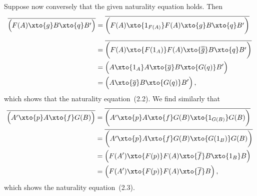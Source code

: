 Suppose now conversely that the given naturality equation holds.
Then
\begin{align*}
	\adjtranspose{
		\Bigl(
			F(A)
			\xto{g}
			B
			\xto{q}
			B'
		\Bigr)
	}
	&=
	\adjtranspose{
		\biggl(
			F(A)
			\xto{1_{F(A)}}
			F(A)
			\xto{g}
			B
			\xto{q}
			B'
		\biggr)
	}
	\\[0.5em]
	&=
	\adjtranspose{
		\biggl(
			F(A)
			\xto{F(1_A)}
			F(A)
			\xto{\adjtranspose{\adjtranspose{g}}}
			B
			\xto{q}
			B'
		\biggr)
	}
	\\
	&=
	\Bigl(
		A
		\xto{1_A}
		A
		\xto{\adjtranspose{g}}
		B
		\xto{G(q)}
		B'
	\Bigr)
	\\
	&=
	\Bigl(
		A
		\xto{\adjtranspose{g}}
		B
		\xto{G(q)}
		B'
	\Bigr) \,,
\end{align*}
which shows that the naturality equation~(2.2).
We find similarly that
\begingroup
\allowdisplaybreaks
\begin{align*}
	\adjtranspose{
		\Bigl(
			A'
			\xto{p}
			A
			\xto{f}
			G(B)
		\Bigr)
	}
	&=
	\adjtranspose{
		\biggl(
			A'
			\xto{p}
			A
			\xto{f}
			G(B)
			\xto{1_{G(B)}}
			G(B)
		\biggr)
	}
	\\
	&=
	\adjtranspose{
		\biggl(
			A'
			\xto{p}
			A
			\xto{f}
			G(B)
			\xto{G(1_B)}
			G(B)
		\biggr)
	}
	\\
	&=
	\Bigl(
		F(A')
		\xto{F(p)}
		F(A)
		\xto{\adjtranspose{f}}
		B
		\xto{1_B}
		B
	\Bigr)
	\\
	&=
	\Bigl(
		F(A')
		\xto{F(p)}
		F(A)
		\xto{\adjtranspose{f}}
		B
	\Bigr) \,,
\end{align*}
\endgroup
which shows the naturality equation~(2.3).

